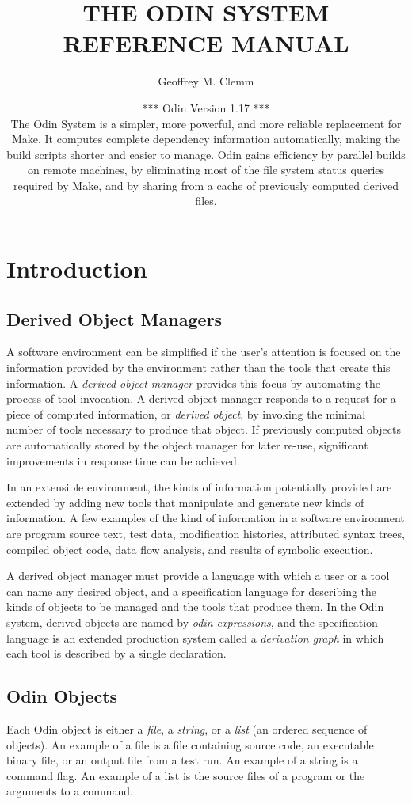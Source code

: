 \documentclass[hidelinks]{report}
\title{
        THE ODIN SYSTEM\\ \vspace{.5in}
        REFERENCE MANUAL
        }
\author{Geoffrey M. Clemm}
\date{
*** Odin Version 1.17 ***\\
The Odin System is a simpler, more powerful, and more reliable
replacement for Make.  It computes complete dependency information
automatically, making the build scripts shorter and easier to manage.
Odin gains efficiency by parallel builds on remote machines,
by eliminating most of the file system status queries required
by Make, and by sharing from a cache of previously computed derived files.
}
\begin{document}
\maketitle

\tableofcontents


\chapter{Introduction}
\label{intro}


\section{Derived Object Managers}

A software environment can be simplified if the
user's attention is focused on the information provided by the environment
rather than the tools that create this information.
A {\em derived object manager} provides this focus
by automating the process of tool invocation.
A derived object manager responds to a request for a piece of computed
information,
or {\em derived object}, by invoking the minimal number of tools
necessary to produce that object.
If previously computed objects are automatically stored by the object manager
for later re-use, significant improvements in response time can be achieved.

In an extensible environment, the kinds of information potentially
provided are extended by adding
new tools that manipulate and generate new kinds of information.
A few examples of the kind of information in a software environment
are program source text, test data, modification histories,
attributed syntax trees, compiled object code, data flow analysis,
and results of symbolic execution.

A derived object manager must provide
a language with which a user or a tool can name any desired object,
and a specification language for describing the kinds of objects to be managed
and the tools that produce them.
In the Odin system,
derived objects are named by {\em odin-expressions},
and the specification language is an extended production system
called a {\em derivation graph}
in which each tool is described by a single declaration.

\section{Odin Objects}

Each Odin object is either
a {\em file}, a {\em string}, or a {\em list} (an ordered sequence of objects).
An example of a file is a file containing source code,
an executable binary file,
or an output file from a test run.
An example of a string is a command flag.
An example of a list is the source files of a program
or the arguments to a command.
\end{document}
